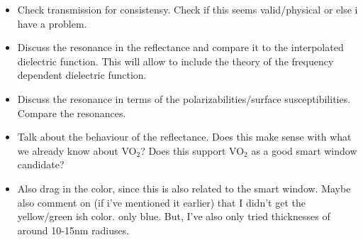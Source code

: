\begin{itemize}
   \item Check transmission for consistensy. Check if this seems valid/physical or else i have a problem.
   \item Discuss the resonance in the reflectance and compare it to the interpolated dielectric function.
      This will allow to include the theory of the frequency dependent dielectric function.
   \item Discuss the resonance in terms of the polarizabilities/surface susceptibilities. Compare 
      the resonances.
   \item Talk about the behaviour of the reflectance. Does this make sense with what we already know
      about VO$_2$? Does this support VO$_2$ as a good smart window candidate?
   \item Also drag in the color, since this is also related to the smart window. 
      Maybe also comment on (if i've mentioned it earlier) that I didn't get the yellow/green ish color.
      only blue. But, I've also only tried thicknesses of around 10-15nm radiuses.
\end{itemize}
